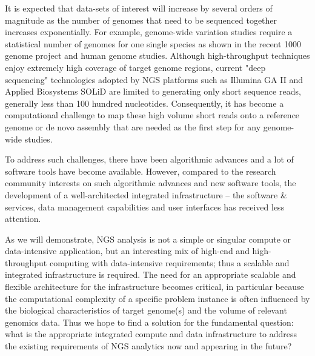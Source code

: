 \documentclass{cpeauth}
\begin{document}
It is expected that data-sets of interest will increase by several
orders of magnitude as the number of genomes that need to be sequenced
together increases exponentially.  For example, genome-wide variation studies require a
statistical number of genomes for one single species as shown in the
recent 1000 genome project and human genome
studies\cite{1000genome,mardis2008-tig,gilad2009,alex2009,kim2011}.
Although high-throughput techniques enjoy extremely high coverage of
target genome regions, current "deep sequencing" technologies adopted
by NGS platforms such as Illumina GA II and Applied Biosystems SOLiD
are limited to generating only short sequence reads, generally less
than 100 hundred nucleotides\cite{metzker2010}. Consequently, it has
become a computational challenge to map these high volume short reads
onto a reference genome or de novo assembly that are needed as the
first step for any genome-wide
studies\cite{alex2009,trapnell2009,scheibye-alsing2009,pop2002,hernandez2008,farrer2008}.


To address such challenges, there have been algorithmic advances and
a lot of software tools have become available\cite{trapnell2009,bfast2009,scheibye-alsing2009,pepke2009,samtools}.
However, compared to the research community interests on such algorithmic advances and new software tools, the
development of a well-architected integrated infrastructure -- the
software \& services, data management capabilities and user interfaces
has received less attention.

As we will demonstrate, NGS analysis is not a simple or singular
compute or data-intensive application, but an interesting mix of
high-end and high-throughput computing with data-intensive
requirements; thus a scalable and integrated infrastructure is
required.  The need for an appropriate scalable and flexible
architecture for the infrastructure becomes critical, in particular because the computational complexity of a specific problem
instance is often influenced by the biological characteristics of
target genome(s) and the volume of relevant genomics data.  Thus we
hope to find a solution for the fundamental question: what is the appropriate
integrated compute and data infrastructure to address the existing
requirements of NGS analytics now and appearing in the future?
\end{document}
